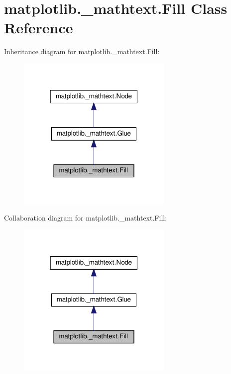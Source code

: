 \hypertarget{classmatplotlib_1_1__mathtext_1_1Fill}{}\section{matplotlib.\+\_\+mathtext.\+Fill Class Reference}
\label{classmatplotlib_1_1__mathtext_1_1Fill}


Inheritance diagram for matplotlib.\+\_\+mathtext.\+Fill\+:
\nopagebreak
\begin{figure}[H]
\begin{center}
\leavevmode
\includegraphics[width=211pt]{classmatplotlib_1_1__mathtext_1_1Fill__inherit__graph}
\end{center}
\end{figure}


Collaboration diagram for matplotlib.\+\_\+mathtext.\+Fill\+:
\nopagebreak
\begin{figure}[H]
\begin{center}
\leavevmode
\includegraphics[width=211pt]{classmatplotlib_1_1__mathtext_1_1Fill__coll__graph}
\end{center}
\end{figure}
